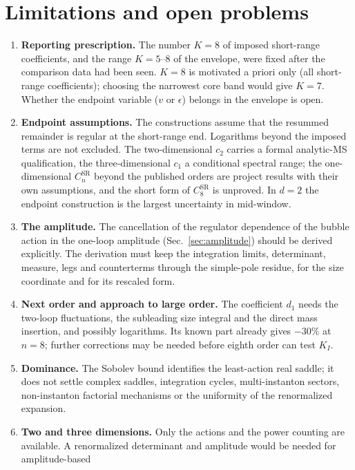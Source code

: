 \documentclass[11pt,a4paper]{article}
\numberwithin{equation}{section}
\newcommand{\CSR}{C^{\mathrm{SR}}}
\begin{document}
\section{Limitations and open problems}\label{sec:open}
\begin{enumerate}
\item \textbf{Reporting prescription.} The number $K=8$ of imposed short-range
coefficients, and the range $K=5$--$8$ of the envelope, were fixed after the comparison data
had been seen. $K=8$ is motivated a priori only (all short-range coefficients); choosing the
narrowest core band would give $K=7$. Whether the endpoint variable ($v$ or $\epsilon$) belongs in the
envelope is open.
\item \textbf{Endpoint assumptions.} The constructions assume that the resummed remainder is
regular at the short-range end. Logarithms beyond the imposed terms are not excluded. The
two-dimensional $c_2$ carries a formal analytic-MS qualification, the three-dimensional
$c_1$ a conditional spectral range; the one-dimensional $\CSR_n$ beyond the published orders
are project results with their own assumptions, and the short form of $\CSR_8$ is unproved.
In $d=2$ the endpoint construction is the largest uncertainty in mid-window.
\item \textbf{The amplitude.} The cancellation of the regulator dependence of the bubble
action in the one-loop amplitude (Sec.~\ref{sec:amplitude}) should be derived explicitly. The
derivation must keep the integration limits, determinant, measure, legs and counterterms
through the simple-pole residue, for the size coordinate and for its rescaled form.
\item \textbf{Next order and approach to large order.} The coefficient $d_1$ needs the
two-loop fluctuations, the subleading size integral and the direct mass insertion, and
possibly logarithms. Its known part already gives $-30\%$ at $n=8$; further corrections may
be needed before eighth order can test $K_I$.
\item \textbf{Dominance.} The Sobolev bound identifies the least-action real saddle; it does
not settle complex saddles, integration cycles, multi-instanton sectors, non-instanton
factorial mechanisms or the uniformity of the renormalized expansion.
\item \textbf{Two and three dimensions.} Only the actions and the power counting are
available. A renormalized determinant and amplitude would be needed for amplitude-based

\end{enumerate}
\end{document}
